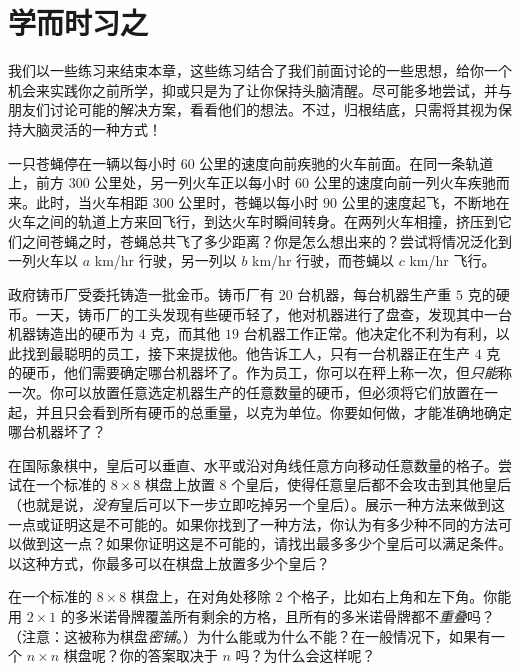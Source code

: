 \section{学而时习之}\label{sec:section1.5}

我们以一些练习来结束本章，这些练习结合了我们前面讨论的一些思想，给你一个机会来实践你之前所学，抑或只是为了让你保持头脑清醒。尽可能多地尝试，并与朋友们讨论可能的解决方案，看看他们的想法。不过，归根结底，只需将其视为保持大脑灵活的一种方式！

\begin{exercise}
    一只苍蝇停在一辆以每小时 $60$ 公里的速度向前疾驰的火车前面。在同一条轨道上，前方 $300$ 公里处，另一列火车正以每小时 $60$ 公里的速度向前一列火车疾驰而来。此时，当火车相距 $300$ 公里时，苍蝇以每小时 $90$ 公里的速度起飞，不断地在火车之间的轨道上方来回飞行，到达火车时瞬间转身。在两列火车相撞，挤压到它们之间苍蝇之时，苍蝇总共飞了多少距离？你是怎么想出来的？尝试将情况泛化到一列火车以 $a$ km/hr 行驶，另一列以 $b$ km/hr 行驶，而苍蝇以 $c$ km/hr 飞行。
\end{exercise}

\begin{exercise}
    政府铸币厂受委托铸造一批金币。铸币厂有 $20$ 台机器，每台机器生产重 $5$ 克的硬币。一天，铸币厂的工头发现有些硬币轻了，他对机器进行了盘查，发现其中一台机器铸造出的硬币为 $4$ 克，而其他 $19$ 台机器工作正常。他决定化不利为有利，以此找到最聪明的员工，接下来提拔他。他告诉工人，只有一台机器正在生产 $4$ 克的硬币，他们需要确定哪台机器坏了。作为员工，你可以在秤上称一次，但\emph{只能}称一次。你可以放置任意选定机器生产的任意数量的硬币，但必须将它们放置在一起，并且只会看到所有硬币的总重量，以克为单位。你要如何做，才能准确地确定哪台机器坏了？
\end{exercise}

\begin{exercise}
    在国际象棋中，皇后可以垂直、水平或沿对角线任意方向移动任意数量的格子。尝试在一个标准的 $8 \times 8$ 棋盘上放置 $8$ 个皇后，使得任意皇后都不会攻击到其他皇后（也就是说，\emph{没有}皇后可以下一步立即吃掉另一个皇后）。展示一种方法来做到这一点或证明这是不可能的。如果你找到了一种方法，你认为有多少种不同的方法可以做到这一点？如果你证明这是不可能的，请找出最多多少个皇后可以满足条件。以这种方式，你最多可以在棋盘上放置多少个皇后？
\end{exercise}

\begin{exercise}
    在一个标准的 $8 \times 8$ 棋盘上，在对角处移除 $2$ 个格子，比如右上角和左下角。你能用 $2 \times 1$ 的多米诺骨牌覆盖所有剩余的方格，且所有的多米诺骨牌都不\emph{重叠}吗？（注意：这被称为棋盘\emph{密铺}。）为什么能或为什么不能？在一般情况下，如果有一个 $n \times n$ 棋盘呢？你的答案取决于 $n$ 吗？为什么会这样呢？
\end{exercise}

